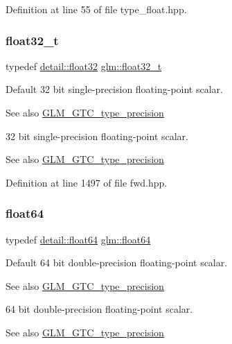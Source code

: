Definition at line 55 of file type\+\_\+float.\+hpp.

\mbox{\label{group__gtc__type__precision_ga642737ae3e7c434b366f2191e6944bf2}} 
\subsubsection{\texorpdfstring{float32\_t}{float32\_t}}
{\footnotesize\ttfamily typedef \mbox{\hyperlink{namespaceglm_1_1detail_ad60558c5c304624de0b54c51b5857737}{detail\+::float32}} \mbox{\hyperlink{group__gtc__type__precision_ga642737ae3e7c434b366f2191e6944bf2}{glm\+::float32\+\_\+t}}}

Default 32 bit single-\/precision floating-\/point scalar. \begin{DoxySeeAlso}{See also}
\mbox{\hyperlink{group__gtc__type__precision}{G\+L\+M\+\_\+\+G\+T\+C\+\_\+type\+\_\+precision}}
\end{DoxySeeAlso}
32 bit single-\/precision floating-\/point scalar. \begin{DoxySeeAlso}{See also}
\mbox{\hyperlink{group__gtc__type__precision}{G\+L\+M\+\_\+\+G\+T\+C\+\_\+type\+\_\+precision}} 
\end{DoxySeeAlso}


Definition at line 1497 of file fwd.\+hpp.

\mbox{\label{group__gtc__type__precision_gab721f828b41f46b20cf4883b50733d3b}} 
\subsubsection{\texorpdfstring{float64}{float64}}
{\footnotesize\ttfamily typedef \mbox{\hyperlink{namespaceglm_1_1detail_a5a0a9a1be3fd5dbe6d47ae45c3022b06}{detail\+::float64}} \mbox{\hyperlink{group__gtc__type__precision_gab721f828b41f46b20cf4883b50733d3b}{glm\+::float64}}}

Default 64 bit double-\/precision floating-\/point scalar. \begin{DoxySeeAlso}{See also}
\mbox{\hyperlink{group__gtc__type__precision}{G\+L\+M\+\_\+\+G\+T\+C\+\_\+type\+\_\+precision}}
\end{DoxySeeAlso}
64 bit double-\/precision floating-\/point scalar. \begin{DoxySeeAlso}{See also}
\mbox{\hyperlink{group__gtc__type__precision}{G\+L\+M\+\_\+\+G\+T\+C\+\_\+type\+\_\+precision}} 
\end{DoxySeeAlso}


